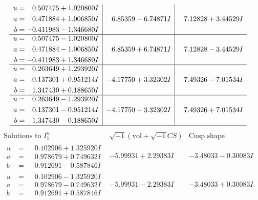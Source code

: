 \documentclass[1p]{elsarticle_modified}
\theoremstyle{definition}
\newcommand{\I}{\sqrt{-1}}
\begin{document}
$$\begin{array}{c|c|c}
\begin{aligned}
u &= \phantom{-}0.507475 + 1.020800 I \\
a &= \phantom{-}0.471884 + 1.006850 I \\
b &= -0.411983 - 1.346680 I\end{aligned}
 & \phantom{-}6.85359 - 6.74871 I & \phantom{-}7.12828 + 3.44529 I \\ \hline\begin{aligned}
u &= \phantom{-}0.507475 - 1.020800 I \\
a &= \phantom{-}0.471884 - 1.006850 I \\
b &= -0.411983 + 1.346680 I\end{aligned}
 & \phantom{-}6.85359 + 6.74871 I & \phantom{-}7.12828 - 3.44529 I \\ \hline\begin{aligned}
u &= \phantom{-}0.263649 + 1.293920 I \\
a &= \phantom{-}0.137301 + 0.951214 I \\
b &= \phantom{-}1.347430 + 0.188650 I\end{aligned}
 & -4.17750 + 3.32302 I & \phantom{-}7.49326 - 7.01534 I \\ \hline\begin{aligned}
u &= \phantom{-}0.263649 - 1.293920 I \\
a &= \phantom{-}0.137301 - 0.951214 I \\
b &= \phantom{-}1.347430 - 0.188650 I\end{aligned}
 & -4.17750 - 3.32302 I & \phantom{-}7.49326 + 7.01534 I\\
 \hline 
 \end{array}$$\newpage$$\begin{array}{c|c|c}  
\text{Solutions to }I^u_{1}& \I (\text{vol} + \sqrt{-1}CS) & \text{Cusp shape}\\
 \hline 
\begin{aligned}
u &= \phantom{-}0.102906 + 1.325920 I \\
a &= \phantom{-}0.978679 + 0.749632 I \\
b &= \phantom{-}0.912691 - 0.587846 I\end{aligned}
 & -5.99931 + 2.29383 I & -3.48033 - 0.30083 I \\ \hline\begin{aligned}
u &= \phantom{-}0.102906 - 1.325920 I \\
a &= \phantom{-}0.978679 - 0.749632 I \\
b &= \phantom{-}0.912691 + 0.587846 I\end{aligned}
 & -5.99931 - 2.29383 I & -3.48033 + 0.30083 I \\ \hline\begin{aligned}

\end{aligned}
\end{array}$$
\end{document}
